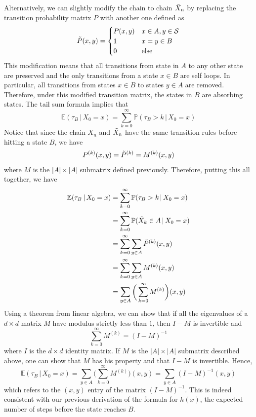 \documentclass{article}
\theoremstyle{remark}
\theoremstyle{definition}
\begin{document}
Alternatively, we can slightly modify the chain to chain $\Tilde{X}_n$ by replacing the transition probability matrix $P$ with another one defined as 
\[\Tilde{P}(x, y) = \begin{cases}
P(x, y) & x \in A, y \in \mathcal{S} \\
1 & x = y \in B \\
0 & \text{else}
\end{cases}\]
This modification means that all transitions from state in $A$ to any other state are preserved and the only transitions from a state $x \in B$ are self loops. In particular, all transitions from states $x \in B$ to states $y \in A$ are removed. Therefore, under this modified transition matrix, the states in $B$ are absorbing states. The tail sum formula implies that
\[\mathbb{E}(\tau_B \,|\, X_0 = x) = \sum_{k=0}^\infty \mathbb{P}(\tau_B > k \,|\, X_0 = x)\]
Notice that since the chain $X_n$ and $\Tilde{X}_n$ have the same transition rules before hitting a state $B$, we have 
\[P^{(k)} (x, y) = \Tilde{P}^{(k)} = M^{(k)}(x, y)\]
where $M$ is the $|A| \times |A|$ submatrix defined previously. Therefore, putting this all together, we have
\begin{align*}
    \mathbb{E}(\tau_B \,|\, X_0 = x) & = \sum_{k=0}^\infty \mathbb{P}(\tau_B > k \,|\, X_0 = x) \\
    & = \sum_{k=0}^\infty \mathbb{P}(\Tilde{X}_k \in A \,|\, X_0 = x) \\
    & = \sum_{k=0}^\infty \sum_{y \in A} \Tilde{P}^{(k)} (x, y) \\
    & = \sum_{k=0}^\infty \sum_{y \in A} M^{(k)} (x, y) \\
    & = \sum_{y \in A} \bigg( \sum_{k=0}^\infty M^{(k)} \bigg) (x, y) 
\end{align*}
Using a theorem from linear algebra, we can show that if all the eigenvalues of a $d \times d$ matrix $M$ have modulus strictly less than $1$, then $I-M$ is invertible and
\[\sum_{k=0}^\infty M^{(k)} = (I - M)^{-1}\]
where $I$ is the $d \times d$ identity matrix. If $M$ is the $|A| \times |A|$ submatrix described above, one can show that $M$ has his property and that $I - M$ is invertible. Hence, 
\[\mathbb{E}(\tau_B \,|\, X_0 = x) = \sum_{y \in A} \bigg( \sum_{k=0}^\infty M^{(k)} \bigg) (x, y) = \sum_{y \in A} (I-M)^{-1} (x, y)\]
which refers to the $(x, y)$ entry of the matrix $(I - M)^{-1}$. This is indeed consistent with our previous derivation of the formula for $h(x)$, the expected number of steps before the state reaches $B$. 
\end{document}
